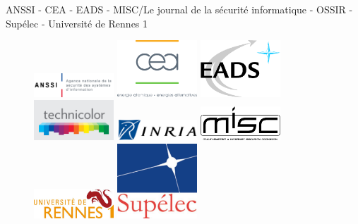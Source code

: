 \begin{center}
ANSSI -  CEA - EADS - MISC/Le journal de la s{\'e}curit{\'e} informatique - OSSIR - Sup\'elec - Universit\'e de Rennes 1
\end{center}

\begin{figure}[h]
\begin{center}
\parbox{3cm}{\includegraphics[width=3cm]{_images/anssi}}
\hfill
\parbox{3cm}{\includegraphics[width=3cm]{_images/cea}}
\hfill
\parbox{3cm}{\includegraphics[width=3cm]{_images/eads}}
\end{center}
\vfill
\begin{center}
\parbox{3cm}{\includegraphics[width=3cm]{_images/technicolor}}
\hfill
\parbox{3cm}{\includegraphics[width=3cm]{_images/inria-rennes}}
\hfill
\parbox{3cm}{\includegraphics[width=3cm]{_images/misc}}
\end{center}
\vfill
\begin{center}
\parbox{3cm}{\includegraphics[width=3cm]{_images/uni-rennes1}}
\hfill
\parbox{3cm}{\includegraphics[width=3cm]{_images/supelec}}

\end{center}
\end{figure}
